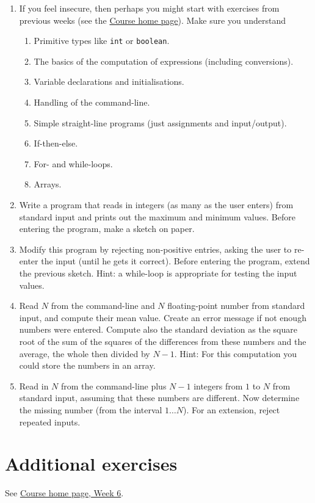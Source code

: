 \documentclass[11pt]{article}
\newcommand{\inl}[1]{\lstinline$#1$}
\begin{document}
\begin{enumerate}
\item If you feel insecure, then perhaps you might start with exercises from previous weeks (see the \href{\chp}{Course home page}). Make sure you understand
  \begin{enumerate}
  \item Primitive types like \inl{int} or \inl{boolean}.
  \item The basics of the computation of expressions (including conversions).
  \item Variable declarations and initialisations.
  \item Handling of the command-line.
  \item Simple straight-line programs (just assignments and input/output).
  \item If-then-else.
  \item For- and while-loops.
  \item Arrays.
  \end{enumerate}
\item Write a program that reads in integers (as many as the user enters) from standard input and prints out the maximum and minimum values. Before entering the program, make a sketch on paper.
\item Modify this program by rejecting non-positive entries, asking the user to re-enter the input (until he gets it correct). Before entering the program, extend the previous sketch. Hint: a while-loop is appropriate for testing the input values.
\item Read $N$ from the command-line and $N$ floating-point number from standard input, and compute their mean value. Create an error message if not enough numbers were entered. Compute also the standard deviation as the square root of the sum of the squares of the differences from these numbers and the average, the whole then divided by $N-1$. Hint: For this computation you could store the numbers in an array.
\item Read in $N$ from the command-line plus $N-1$ integers from $1$ to $N$ from standard input, assuming that these numbers are different. Now determine the missing number (from the interval $1 \dots N$). For an extension, reject repeated inputs.


\end{enumerate}


\section{Additional exercises}
\label{sec:addex}

See \href{\chp#ExercisesWeek06}{Course home page, Week 6}.
\end{document}
